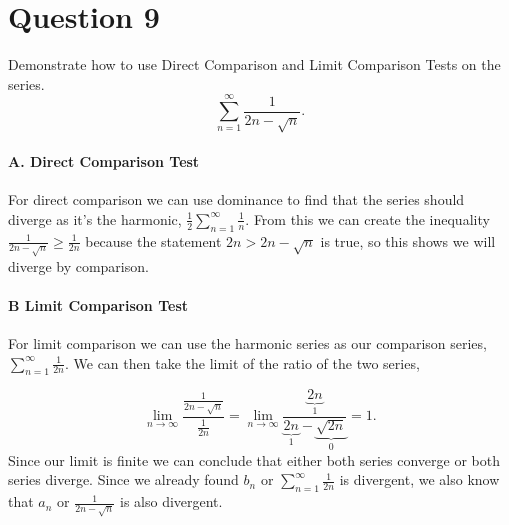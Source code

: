 \documentclass[a4paper]{article}
\begin{document}
\section*{Question 9}%
\label{sec:Question 9}
Demonstrate how to use Direct Comparison and Limit Comparison Tests on the series.  
\[
\sum_{ n=1 } ^{ \infty } \frac{ 1 }{ 2n-\sqrt{ n} } 
.\] 
\paragraph{A. Direct Comparison Test \\}
For direct comparison we can use dominance to find that the series should diverge as it's the harmonic, $ \frac{ 1 }{ 2 } \sum_{ n=1 } ^{ \infty } \frac{ 1 }{ n }  $. From this we can create the inequality $ \frac{ 1 }{ 2n-\sqrt{ n} } \ge \frac{ 1 }{ 2n } $ because the statement $ 2n > 2n -\sqrt{ n} $ is true, so this shows we will diverge by comparison.

\paragraph{B Limit Comparison Test \\}
For limit comparison we can use the harmonic series as our comparison series, $ \sum_{ n=1 } ^{ \infty } \frac{ 1 }{ 2n }  $. We can then take the limit of the ratio of the two series,

\[
\lim_{ n \to \infty} \frac{ \frac{ 1 }{ 2n-\sqrt{ n} }  }{ \frac{ 1 }{ 2n }  }= \lim_{ n \to \infty} \frac{ \underbrace{ 2n }_{ 1 } }{ \underbrace{ 2n }_{ 1 } - \underbrace{ \sqrt{ 2n} }_{ 0 }  } = 1
.\] 
Since our limit is finite we can conclude that either both series converge or both series diverge. Since we already found $ b_n $ or $ \sum_{ n=1 } ^{ \infty } \frac{ 1 }{ 2n }  $ is divergent, we also know that $ a_n $ or $ \frac{ 1 }{ 2n -\sqrt{ n} }  $ is also divergent. 
\end{document}
